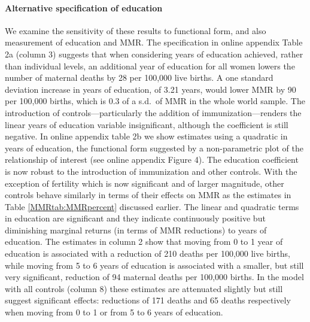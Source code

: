 \documentclass{article}[12pt,subeqn]
\begin{document}
\begin{spacing}{1.4}
\paragraph{Alternative specification of education}
We examine the sensitivity of these results to functional form, and also
measurement of education and MMR.  The specification in online appendix
Table 2a (column 3) suggests that when considering years of
education achieved, rather than individual levels, an additional year of
education for all women lowers the number of maternal deaths by 28 per
100,000 live births. A one standard deviation increase in years of 
education, of 3.21 years, would lower MMR by 90 per 100,000 births, which
is 0.3 of a s.d.\ of MMR in the whole world sample. The introduction of
controls---particularly the addition of immunization---renders the linear
years of education variable insignificant, although the coefficient is
still negative. In online appendix table 2b we show estimates
using a quadratic in years of education, the functional form suggested by
a non-parametric plot of the relationship of interest (see online appendix
Figure 4). The education coefficient is now robust to the
introduction of immunization and other controls. With the exception of 
fertility which is now significant and of larger magnitude, other controls 
behave similarly in terms of their effects on MMR as the estimates in Table 
\ref{MMRtab:MMRpercent} discussed earlier. The linear and quadratic terms in
education are significant and they indicate continuously positive but diminishing
marginal returns (in terms of MMR reductions) to years of education. The estimates
in column 2 show that moving from 0 to 1 year of education is associated with a 
reduction of 210 deaths per 100,000 live births, while moving from 5 to 6 years 
of education is associated with a smaller, but still very significant, reduction 
of 94 maternal deaths per 100,000 births. In the model with all controls (column 
8) these estimates are attenuated slightly but still suggest significant effects: 
reductions of 171 deaths and 65 deaths respectively when moving from 0 to 1 or 
from 5 to 6 years of education.


\end{spacing}
\end{document}
